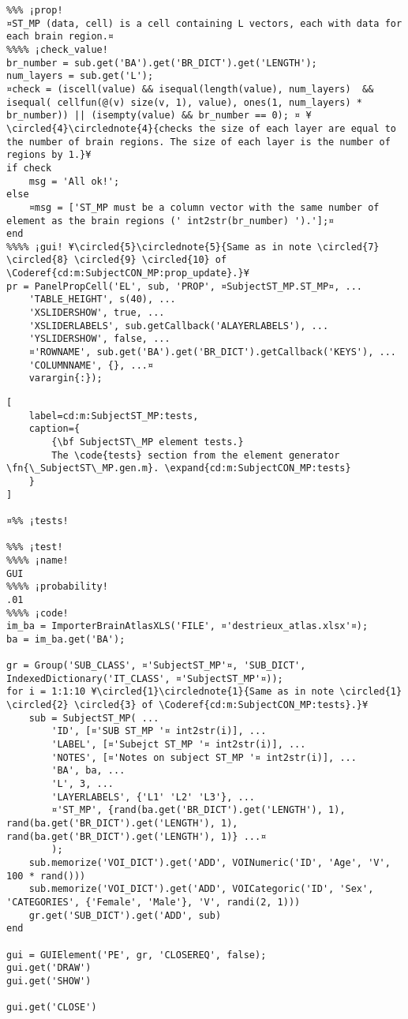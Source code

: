 \documentclass{tufte-handout}
\begin{document}
\begin{lstlisting}
%%% ¡prop!
¤ST_MP (data, cell) is a cell containing L vectors, each with data for each brain region.¤
%%%% ¡check_value!
br_number = sub.get('BA').get('BR_DICT').get('LENGTH');
num_layers = sub.get('L');
¤check = (iscell(value) && isequal(length(value), num_layers)  && isequal( cellfun(@(v) size(v, 1), value), ones(1, num_layers) * br_number)) || (isempty(value) && br_number == 0); ¤ ¥\circled{4}\circlednote{4}{checks the size of each layer are equal to the number of brain regions. The size of each layer is the number of regions by 1.}¥
if check
    msg = 'All ok!';
else   
    ¤msg = ['ST_MP must be a column vector with the same number of element as the brain regions (' int2str(br_number) ').'];¤
end
%%%% ¡gui! ¥\circled{5}\circlednote{5}{Same as in note \circled{7} \circled{8} \circled{9} \circled{10} of \Coderef{cd:m:SubjectCON_MP:prop_update}.}¥
pr = PanelPropCell('EL', sub, 'PROP', ¤SubjectST_MP.ST_MP¤, ...
    'TABLE_HEIGHT', s(40), ...
    'XSLIDERSHOW', true, ...
    'XSLIDERLABELS', sub.getCallback('ALAYERLABELS'), ...
    'YSLIDERSHOW', false, ...
    ¤'ROWNAME', sub.get('BA').get('BR_DICT').getCallback('KEYS'), ...
    'COLUMNNAME', {}, ...¤
    varargin{:});

\end{lstlisting}

\begin{lstlisting}[
	label=cd:m:SubjectST_MP:tests,
	caption={
		{\bf SubjectST\_MP element tests.}
		The \code{tests} section from the element generator \fn{\_SubjectST\_MP.gen.m}. \expand{cd:m:SubjectCON_MP:tests}
	}
]

¤%% ¡tests!

%%% ¡test!
%%%% ¡name!
GUI
%%%% ¡probability!
.01
%%%% ¡code!
im_ba = ImporterBrainAtlasXLS('FILE', ¤'destrieux_atlas.xlsx'¤);
ba = im_ba.get('BA');

gr = Group('SUB_CLASS', ¤'SubjectST_MP'¤, 'SUB_DICT', IndexedDictionary('IT_CLASS', ¤'SubjectST_MP'¤));
for i = 1:1:10 ¥\circled{1}\circlednote{1}{Same as in note \circled{1} \circled{2} \circled{3} of \Coderef{cd:m:SubjectCON_MP:tests}.}¥
    sub = SubjectST_MP( ...
        'ID', [¤'SUB ST_MP '¤ int2str(i)], ...
        'LABEL', [¤'Subejct ST_MP '¤ int2str(i)], ...
        'NOTES', [¤'Notes on subject ST_MP '¤ int2str(i)], ...
        'BA', ba, ...
        'L', 3, ...
        'LAYERLABELS', {'L1' 'L2' 'L3'}, ...
        ¤'ST_MP', {rand(ba.get('BR_DICT').get('LENGTH'), 1), rand(ba.get('BR_DICT').get('LENGTH'), 1), rand(ba.get('BR_DICT').get('LENGTH'), 1)} ...¤
        );
    sub.memorize('VOI_DICT').get('ADD', VOINumeric('ID', 'Age', 'V', 100 * rand()))
    sub.memorize('VOI_DICT').get('ADD', VOICategoric('ID', 'Sex', 'CATEGORIES', {'Female', 'Male'}, 'V', randi(2, 1)))
    gr.get('SUB_DICT').get('ADD', sub)
end

gui = GUIElement('PE', gr, 'CLOSEREQ', false);
gui.get('DRAW')
gui.get('SHOW')

gui.get('CLOSE')
\end{lstlisting}
\end{document}
